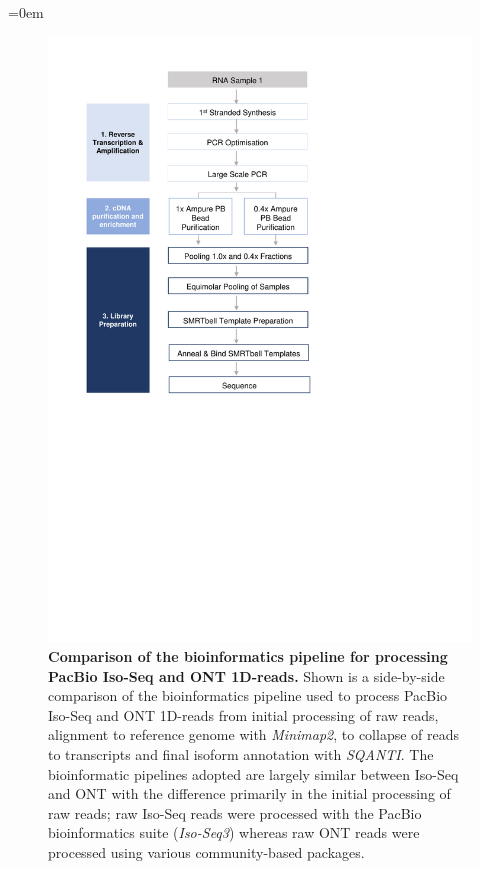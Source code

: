 \begingroup
\parindent=0em
\localtableofcontents 
\endgroup

\begin{figure}[htp]
	\centering
	\includegraphics[page=15,trim={0cm 6cm 0cm 0cm},clip,scale = 0.8]{Figures/ProjectDevelopment_Figures}
	\captionsetup{width=0.95\textwidth,singlelinecheck=off}
	\caption[Comparison of the bioinformatics pipeline for processing PacBio Iso-Seq and ONT 1D-reads]%
	{\textbf{Comparison of the bioinformatics pipeline for processing PacBio Iso-Seq and ONT 1D-reads.} Shown is a side-by-side comparison of the bioinformatics pipeline used to process PacBio Iso-Seq and ONT 1D-reads from initial processing of raw reads, alignment to reference genome with \textit{Minimap2}, to collapse of reads to transcripts and final isoform annotation with \textit{SQANTI}. The bioinformatic pipelines adopted are largely similar between Iso-Seq and ONT with the difference primarily in the initial processing of raw reads; raw Iso-Seq reads were processed with the PacBio bioinformatics suite (\textit{Iso-Seq3}) whereas raw ONT reads were processed using various community-based packages.   
	}
	\label{fig:ONT_PacBio_bioinformatics}
\end{figure}

